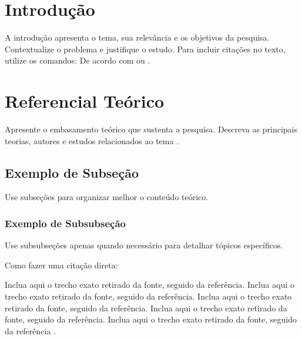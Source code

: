 \documentclass[a4paper,12pt]{article}
\begin{document}
\capaartigo
\clearpage
\contracapaartigo
\clearpage

\iniciarpaginacao
\infoartigo




\section{Introdução}

A introdução apresenta o tema, sua relevância e os objetivos da pesquisa. Contextualize o problema e justifique o estudo. Para
incluir citações no texto, utilize os comandos: De acordo com  ou .

\section{Referencial Teórico}
Apresente o embasamento teórico que sustenta a pesquisa.
Descreva as principais teorias, autores e estudos relacionados ao tema \cite{nussenzveig2013}.

\subsection{Exemplo de Subseção}
Use subseções para organizar melhor o conteúdo teórico.

\subsubsection{Exemplo de Subsubseção}
Use subsubseções apenas quando necessário para detalhar tópicos específicos.

Como fazer uma citação direta:
\begin{citacaodireta}
Inclua aqui o trecho exato retirado da fonte, seguido da referência.
Inclua aqui o trecho exato retirado da fonte, seguido da referência.
Inclua aqui o trecho exato retirado da fonte, seguido da referência.
Inclua aqui o trecho exato retirado da fonte, seguido da referência.
Inclua aqui o trecho exato retirado da fonte, seguido da referência \cite[p.~5]{nussenzveig2013}. 
\end{citacaodireta}
\end{document}
